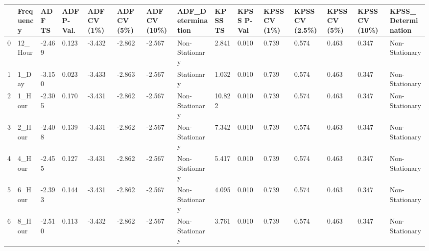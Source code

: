 \begin{tabular}{lllllllllllllll}
\toprule
 & Frequency & ADF TS & ADF P-Val. & ADF CV (1\%) & ADF CV (5\%) & ADF CV (10\%) & ADF_Determination & KPSS TS & KPSS P-Val & KPSS CV (1\%) & KPSS CV (2.5\%) & KPSS CV (5\%) & KPSS CV (10\%) & KPSS_Determination \\
\midrule
0 & 12_Hour & -2.469 & 0.123 & -3.432 & -2.862 & -2.567 & Non-Stationary & 2.841 & 0.010 & 0.739 & 0.574 & 0.463 & 0.347 & Non-Stationary \\
1 & 1_Day & -3.150 & 0.023 & -3.433 & -2.863 & -2.567 & Stationary & 1.032 & 0.010 & 0.739 & 0.574 & 0.463 & 0.347 & Non-Stationary \\
2 & 1_Hour & -2.305 & 0.170 & -3.431 & -2.862 & -2.567 & Non-Stationary & 10.822 & 0.010 & 0.739 & 0.574 & 0.463 & 0.347 & Non-Stationary \\
3 & 2_Hour & -2.408 & 0.139 & -3.431 & -2.862 & -2.567 & Non-Stationary & 7.342 & 0.010 & 0.739 & 0.574 & 0.463 & 0.347 & Non-Stationary \\
4 & 4_Hour & -2.455 & 0.127 & -3.431 & -2.862 & -2.567 & Non-Stationary & 5.417 & 0.010 & 0.739 & 0.574 & 0.463 & 0.347 & Non-Stationary \\
5 & 6_Hour & -2.393 & 0.144 & -3.431 & -2.862 & -2.567 & Non-Stationary & 4.095 & 0.010 & 0.739 & 0.574 & 0.463 & 0.347 & Non-Stationary \\
6 & 8_Hour & -2.510 & 0.113 & -3.432 & -2.862 & -2.567 & Non-Stationary & 3.761 & 0.010 & 0.739 & 0.574 & 0.463 & 0.347 & Non-Stationary \\
\bottomrule
\end{tabular}
